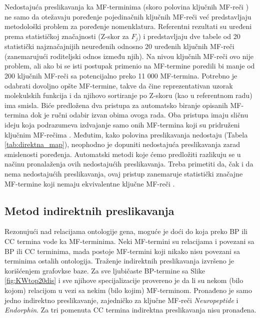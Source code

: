 Nedostajuća preslikavanja ka MF-terminima (skoro polovina ključnih MF-reči ) ne
samo da otežavaju poređenje pojedinačnih ključnih MF-reči već predstavljaju
metodološki problem za poređenje nomenklatura.  Referentni rezultati su uređeni
prema statističkoj značajnosti (Z-skor za $F_j$) i predstavljaju dve tabele od
20 statistički najznačajnijih neuređenih odnosno 20 uređenih ključnih MF-reči 
(zanemarujući roditeljski odnos između njih). Na nivou ključnih MF-reči ovo nije
problem, ali ako bi se isti postupak primenio na MF-termine poredili bi manje
od 200 ključnih MF-reči  sa potencijalno preko 11 000 MF-termina. Potrebno je
odabrati dovoljno opšte MF-termine, takve da čine reprezentativan uzorak
molekulskih funkcija i da njihovo sortiranje po Z-skoru (kao u referentnom
radu) ima smisla.  Biće predložena dva pristupa za automatsko biranje opisanih
MF-termina dok je ručni odabir izvan obima ovoga rada.  Oba pristupa imaju
sličnu ideju koja podrazumeva izdvajanje samo onih MF-termina koji su
pridruženi ključnim MF-rečima .  Međutim, kako polovina preslikavanja nedostaju
(Tabela \ref{tab:direktna_map}), neophodno je dopuniti nedostajuća
preslikavanja zarad smislenosti poređenja.  Automatski metodi koje ćemo
predložiti razlikuju se u načinu pronalaženja ovih nedostajućih preslikavanja.
Treba primetiti da, čak i da nema nedostajućih preslikavanja, ovaj pristup
zanemaruje statistički značajne MF-termine koji nemaju ekvivalentne ključne
MF-reči . 



\clearpage

\subsection{Metod indirektnih preslikavanja}

Rezonujući nad relacijama ontologije gena, moguće je doći do
 koja preko BP ili CC termina vode ka
MF-terminima. Neki MF-termini su relacijama  i
 povezani sa BP ili CC terminima, mada postoje MF-termini
koji nikako nisu povezani sa terminima ostalih  ontologija. Traženje
indirektnih preslikavanja izvršeno je korišćenjem  grafovkse
baze.  Za sve ljubičaste BP-termine sa Slike \ref{fig:KWtop20dis} i sve njihove
specijalizacije provereno je da li su nekom (bilo kojom) relacijom u vezi sa
nekim (bilo kojim) MF-terminom. Pronađeno je samo jedno indirektno
preslikavanje, zajedničko za ključne MF-reči  \textit{Neuropeptide} i
\textit{Endorphin}. Za tri pomenuta CC termina indirektna preslikavanja nisu
pronađena. 


